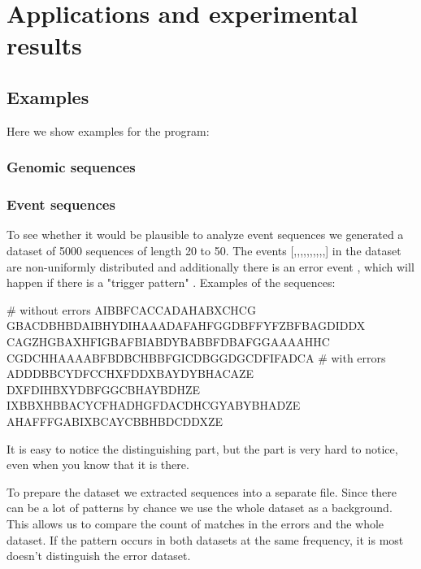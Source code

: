 \chapter{Applications and experimental results}
\label{c:results}

\WIP

\section{Examples}

Here we show examples for the program:

\subsection{Genomic sequences}


\subsection{Event sequences}

To see whether it would be plausible to analyze event sequences we generated a dataset of 5000 sequences of length 20 to 50. The events [,,,,,,,,,,] in the dataset are non-uniformly distributed and additionally there is an error event , which will happen if there is a "trigger pattern" . Examples of the sequences:

\begin{file}
# without errors
AIBBFCACCADAHABXCHCG
GBACDBHBDAIBHYDIHAAADAFAHFGGDBFFYFZBFBAGDIDDX
CAGZHGBAXHFIGBAFBIABDYBABBFDBAFGGAAAAHHC
CGDCHHAAAABFBDBCHBBFGICDBGGDGCDFIFADCA
# with errors
ADDDBBCYDFCCHXFDDXBAYDYBHACAZE
DXFDIHBXYDBFGGCBHAYBDHZE
IXBBXHBBACYCFHADHGFDACDHCGYABYBHADZE
AHAFFFGABIXBCAYCBBHBDCDDXZE
\end{file}

It is easy to notice the distinguishing  part, but the  part is very hard to notice, even when you know that it is there.

To prepare the dataset we extracted sequences into a separate file. Since there can be a lot of patterns by chance we use the whole dataset as a background. This allows us to compare the count of matches in the errors and the whole dataset. If the pattern occurs in both datasets at the same frequency, it is most doesn't distinguish the error dataset.

